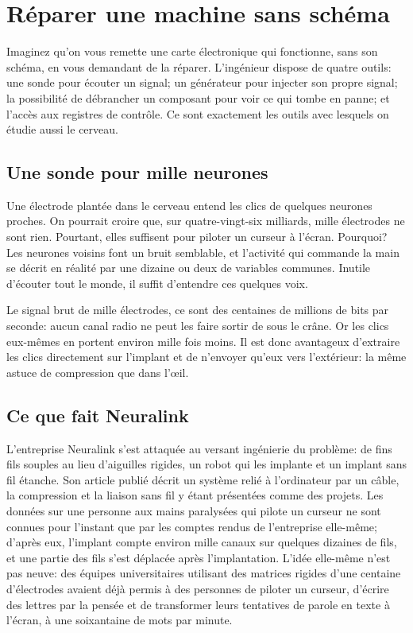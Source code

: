 \chapter{Réparer une machine sans schéma}


Imaginez qu'on vous remette une carte électronique qui fonctionne, sans son schéma, en vous demandant de la réparer. L'ingénieur dispose de quatre outils: une sonde pour écouter un signal; un générateur pour injecter son propre signal; la possibilité de débrancher un composant pour voir ce qui tombe en panne; et l'accès aux registres de contrôle. Ce sont exactement les outils avec lesquels on étudie aussi le cerveau.

\section*{Une sonde pour mille neurones}

Une électrode plantée dans le cerveau entend les clics de quelques neurones proches. On pourrait croire que, sur quatre-vingt-six milliards, mille électrodes ne sont rien. Pourtant, elles suffisent pour piloter un curseur à l'écran. Pourquoi? Les neurones voisins font un bruit semblable, et l'activité qui commande la main se décrit en réalité par une dizaine ou deux de variables communes. Inutile d'écouter tout le monde, il suffit d'entendre ces quelques \og voix\fg{}.

Le signal brut de mille électrodes, ce sont des centaines de millions de bits par seconde: aucun canal radio ne peut les faire sortir de sous le crâne. Or les clics eux-mêmes en portent environ mille fois moins. Il est donc avantageux d'extraire les clics directement sur l'implant et de n'envoyer qu'eux vers l'extérieur: la même astuce de compression que dans l'œil.

\section*{Ce que fait Neuralink}

L'entreprise Neuralink s'est attaquée au versant ingénierie du problème: de fins fils souples au lieu d'aiguilles rigides, un robot qui les implante et un implant sans fil étanche. Son article publié décrit un système relié à l'ordinateur par un câble, la compression et la liaison sans fil y étant présentées comme des projets. Les données sur une personne aux mains paralysées qui pilote un curseur ne sont connues pour l'instant que par les comptes rendus de l'entreprise elle-même; d'après eux, l'implant compte environ mille canaux sur quelques dizaines de fils, et une partie des fils s'est déplacée après l'implantation. L'idée elle-même n'est pas neuve: des équipes universitaires utilisant des matrices rigides d'une centaine d'électrodes avaient déjà permis à des personnes de piloter un curseur, d'\og écrire\fg{} des lettres par la pensée et de transformer leurs tentatives de parole en texte à l'écran, à une soixantaine de mots par minute.

